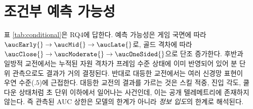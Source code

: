 
\section{조건부 예측 가능성}
\label{sec:results-conditional}



표 \ref{tab:conditional}은 RQ4에 답한다. 예측 가능성은 게임 국면에 따라 $\aucEarly{} \to \aucMid{} \to \aucLate{}$로, 골드 격차에 따라 $\aucClose{} \to \aucModerate{} \to \aucOneSided{}$으로 단조 증가한다. 후반과 일방적 교전에서는 누적된 자원 격차가 프레임 수준 상태에 이미 반영되어 있어 분 단위 관측으로도 결과가 거의 결정된다. 반대로 대등한 교전에서는 여러 신경망 표현이 우연 수준($.5$)에 근접한다. 대등한 교전의 결과를 가르는 것은 스킬 적중, 진입 각도, 쿨다운 상태처럼 초 단위 이하에서 일어나는 사건인데, 이는 공개 텔레메트리에 존재하지 않는다. 즉 관측된 AUC 상한은 모델의 한계가 아니라 \emph{정보 입도}의 한계로 해석된다.

